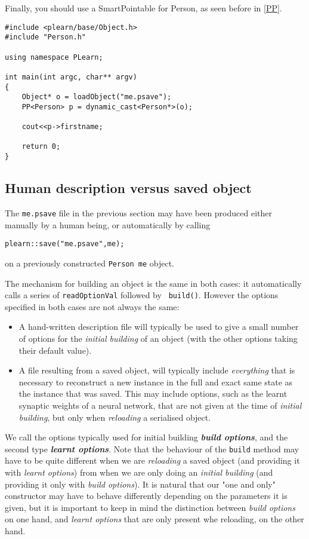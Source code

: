 \documentclass[11pt]{book}
\begin{document}
Finally, you should use a SmartPointable for Person, as seen before in \ref{PP}.

\begin{verbatim}
#include <plearn/base/Object.h>
#include "Person.h"

using namespace PLearn;

int main(int argc, char** argv)
{
    Object* o = loadObject("me.psave"); 
    PP<Person> p = dynamic_cast<Person*>(o);

    cout<<p->firstname;

    return 0;
}
\end{verbatim}


\subsection{Human description versus saved object}

The {\tt me.psave} file in the previous section may have been produced
either manually by a human being, or automatically by calling
\begin{verbatim}
plearn::save("me.psave",me);
\end{verbatim}
on a previously constructed {\tt Person me} object.

The mechanism for building an object is the same in both cases: it
automatically calls a series of {\tt readOptionVal} followed by {\tt
build()}. However the options specified in both cases are not always the
same:

\begin{itemize}

\item A hand-written description file will typically be used to give
a small number of options for the {\em initial building} of an object
(with the other options taking their default value).

\item A file resulting from a saved object, will typically include {\em
everything} that is necessary to reconstruct a new instance in the full
and exact same state as the instance that was saved. This may include
options, such as the learnt synaptic weights of a neural network, that
are not given at the time of {\em initial building}, but only when {\em
reloading} a serialised object.

\end{itemize}

We call the options typically used for initial building {\em \bf build
options}, and the second type {\em \bf learnt options}. Note that the
behaviour of the {\tt build} method may have to be quite different when
we are {\em reloading} a saved object (and providing it with {\em learnt
options}) from when we are only doing an {\em initial building} (and
providing it only with {\em build options}). It is natural that our
"one and only" constructor may have to behave differently depending on
the parameters it is given, but it is important to keep in mind the
distinction between {\em build options} on one hand, and {\em learnt
options} that are only present whe reloading, on the other hand.
\end{document}
